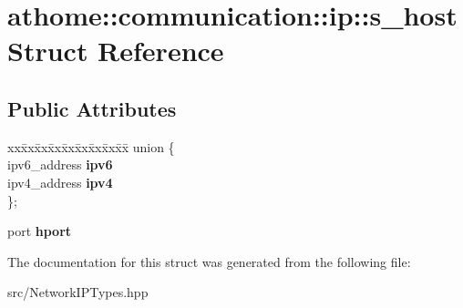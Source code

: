 \hypertarget{structathome_1_1communication_1_1ip_1_1s__host}{}\section{athome\+:\+:communication\+:\+:ip\+:\+:s\+\_\+host Struct Reference}
\label{structathome_1_1communication_1_1ip_1_1s__host}
\subsection*{Public Attributes}
\begin{DoxyCompactItemize}
\item 
\mbox{\label{structathome_1_1communication_1_1ip_1_1s__host_a729beda2149b1c34039edbcfc794ab96}} 
\begin{tabbing}
xx\=xx\=xx\=xx\=xx\=xx\=xx\=xx\=xx\=\kill
union \{\\
\>ipv6\_address {\bfseries ipv6}\\
\>ipv4\_address {\bfseries ipv4}\\
\}; \\

\end{tabbing}\item 
\mbox{\label{structathome_1_1communication_1_1ip_1_1s__host_a676f8f8134a3ef8bb3363c71488d1da2}} 
port {\bfseries hport}
\end{DoxyCompactItemize}


The documentation for this struct was generated from the following file\+:\begin{DoxyCompactItemize}
\item 
src/Network\+I\+P\+Types.\+hpp\end{DoxyCompactItemize}
